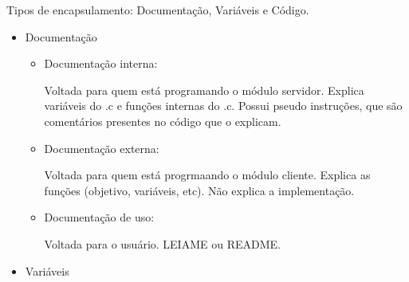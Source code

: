 \documentclass[
	12pt, %
]{fphw}
\begin{document}
\begin{doublespace}
\begin{enumerate}
\begin{enumerate}
              \end{enumerate}

              Tipos de encapsulamento: Documentação, Variáveis e Código.

              \begin{itemize}

                  \item Documentação

                        \begin{itemize}

                            \item Documentação interna:

                                  Voltada para quem está programando o módulo servidor. Explica variáveis do .c e funções internas do .c. Possui pseudo instruções, que são comentários presentes no código que o explicam.

                            \item Documentação externa:

                                  Voltada para quem está progrmaando o módulo cliente. Explica as funções (objetivo, variáveis, etc). Não explica a implementação.

                            \item Documentação de uso:

                                  Voltada para o usuário. LEIAME ou README.

                        \end{itemize}

                  \item Variáveis


\end{itemize}
\end{enumerate}
\end{doublespace}
\end{document}

